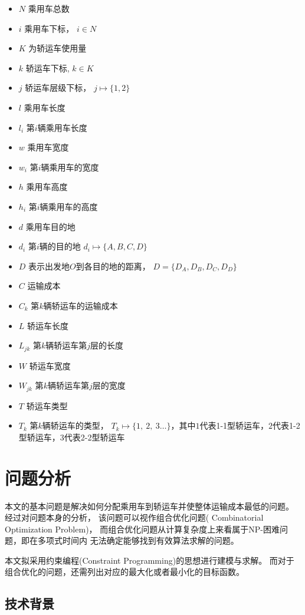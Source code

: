 \documentclass[UTF8]{ctexart}
\begin{document}
	\begin{itemize}
		\item $N$ 乘用车总数
		\item $i$ 乘用车下标， $i \in N$
		\item $K$ 为轿运车使用量
		\item $k$ 轿运车下标,  $k \in K$
		\item $j$ 轿运车层级下标， $j \mapsto \{1,2\}$
		\item $l$ 乘用车长度
		\item $l_i$ 第$i$辆乘用车长度
		\item $w$ 乘用车宽度
		\item $w_i$ 第$i$辆乘用车的宽度
		\item $h$ 乘用车高度
		\item $h_i$ 第$i$辆乘用车的高度
		\item $d$ 乘用车目的地
		\item $d_i$ 第$i$辆的目的地 $d_i \mapsto \{A, B, C, D\}$
		\item $D$ 表示出发地$O$到各目的地的距离， $D=\{D_A, D_B, D_C, D_D\}$
		\item $C$ 运输成本
		\item $C_k$ 第$k$辆轿运车的运输成本
		\item $L$ 轿运车长度
		\item $L_{jk}$ 第$k$辆轿运车第$j$层的长度
		\item $W$ 轿运车宽度
		\item $W_{jk}$ 第$k$辆轿运车第$j$层的宽度
		\item $T$ 轿运车类型
		\item $T_k$ 第$k$辆轿运车的类型， $T_k \mapsto \{1, ~2, ~3 \dots \}$，其中$1$代表1-1型轿运车，$2$代表1-2型轿运车，$3$代表2-2型轿运车
		
		
	\end{itemize}


\section{问题分析}
本文的基本问题是解决如何分配乘用车到轿运车并使整体运输成本最低的问题。
经过对问题本身的分析，
该问题可以视作组合优化问题( Combinatorial Optimization Problem)，
而组合优化问题从计算复杂度上来看属于NP-困难问题，即在多项式时间内
无法确定能够找到有效算法求解的问题。

本文拟采用约束编程(Constraint Programming)的思想进行建模与求解。
而对于组合优化的问题，还需列出对应的最大化或者最小化的目标函数。


\subsection{技术背景}
\end{document}
